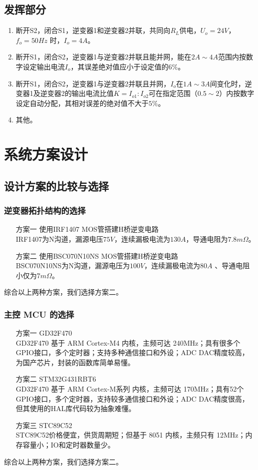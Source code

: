 \documentclass[a4paper,12pt]{article}
\begin{document}
\subsection{发挥部分}
\begin{enumerate}
    \item 断开S2，闭合S1，逆变器1和逆变器2并联，共同向$R_L$供电，$U_o=24V$， $f_o=50Hz$ 时，$I_o=4A$。
    \item 断开S1，闭合S2，逆变器1与逆变器2并联且能并网，能在$2A\sim4A$范围内按数字设定输出电流$I_o$，其误差绝对值应小于设定值的$6\%$。
    \item 断开S1，闭合S2，逆变器1与逆变器2并联且并网，$I_o$在$1A\sim 3A$间变化时，逆变器1及逆变器2的输出电流比值$K=I_{o1}:I_{o2}$可在指定范围（$0.5\sim 2$）内按数字设定自动分配，其相对误差的绝对值不大于$5\%$。
    \item 其他。
\end{enumerate}

\newpage

\section{系统方案设计}
\subsection{设计方案的比较与选择}

\subsubsection{逆变器拓扑结构的选择}
\begin{enumerate}
    \item[方案一] 使用IRF1407 MOS管搭建H桥逆变电路 \\ IRF1407为N沟道，漏源电压$75V$，连续漏极电流为$130A$，导通电阻为$7.8m\Omega$。
    \item[方案二] 使用BSC070N10NS MOS管搭建H桥逆变电路 \\ BSC070N10NS为N沟道，漏源电压为$100V$，连续漏极电流为$80A$ 、导通电阻小仅为$7m\Omega$。
\end{enumerate}
综合以上两种方案，我们选择方案二。

\subsubsection{主控 MCU 的选择}
\begin{enumerate}
    \item[方案一] GD32F470 \\ GD32F470 基于 ARM Cortex-M4 内核，主频可达 240MHz；具有很多个GPIO接口，多个定时器；支持多种通信接口和外设；ADC DAC精度较高，为国产芯片，封装的函数库简单易懂。
    \item[方案二] STM32G431RBT6 \\ GD32F470 基于 ARM Cortex-M系列 内核，主频可达 170MHz；具有52个GPIO接口，多个定时器，支持较多通信接口和外设；ADC DAC精度很高，但其使用的HAL库代码较为抽象难懂。    
    \item[方案三] STC89C52 \\ STC89C52价格便宜，供货周期短；但基于 8051 内核，主频只有 12MHz；内存容量小；IO和定时器数量少。
\end{enumerate}
综合以上两种方案，我们选择方案二。
\end{document}

